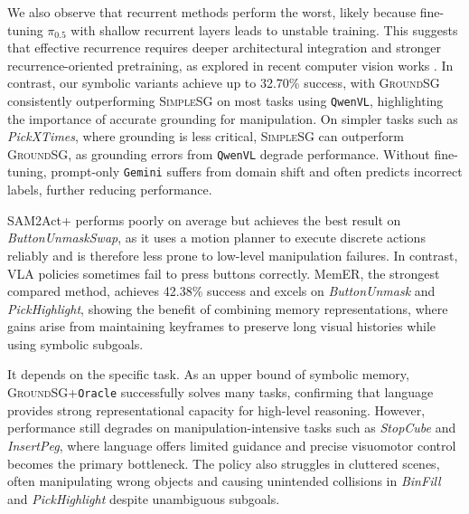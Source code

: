 We also observe that recurrent methods perform the worst, likely because fine-tuning $\pi_{0.5}$ with shallow recurrent layers leads to unstable training. This suggests that effective recurrence requires deeper architectural integration and stronger recurrence-oriented pretraining, as explored in recent computer vision works \cite{zhang2025test, wang2026tttlrm}.
In contrast, our symbolic variants achieve up to 32.70\% success, with \textsc{GroundSG} consistently outperforming \textsc{SimpleSG} on most tasks using \texttt{QwenVL}, highlighting the importance of accurate grounding for manipulation.
On simpler tasks such as \textit{PickXTimes}, where grounding is less critical, \textsc{SimpleSG} can outperform \textsc{GroundSG}, as grounding errors from \texttt{QwenVL} degrade performance. 
Without fine-tuning, prompt-only \texttt{Gemini} suffers from domain shift and often predicts incorrect labels, further reducing performance.

SAM2Act+ performs poorly on average but achieves the best result on \textit{ButtonUnmaskSwap}, as it uses a motion planner to execute discrete actions reliably and is therefore less prone to low-level manipulation failures.
In contrast, VLA policies sometimes fail to press buttons correctly.
MemER, the strongest compared method, achieves 42.38\% success and excels on \textit{ButtonUnmask} and \textit{PickHighlight}, showing the benefit of combining  memory representations, where gains arise from maintaining keyframes to preserve long visual histories while using symbolic subgoals.



It depends on the specific task. As an upper bound of symbolic memory, \textsc{GroundSG}+\texttt{Oracle} successfully solves many tasks, confirming that language provides strong representational capacity for high-level reasoning. However, performance still degrades on manipulation-intensive tasks such as \textit{StopCube} and \textit{InsertPeg}, where language offers limited guidance and precise visuomotor control becomes the primary bottleneck. The policy also struggles in cluttered scenes, often manipulating wrong objects and causing unintended collisions in  \textit{BinFill} and \textit{PickHighlight} despite unambiguous subgoals.


